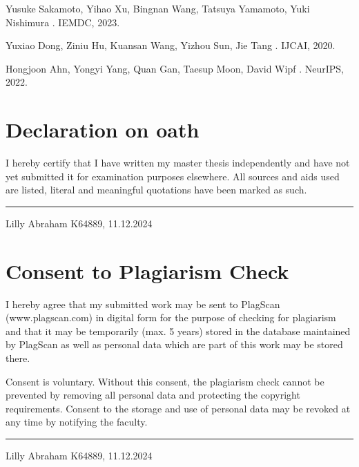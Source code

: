 \documentclass{report} %
\begin{document}
\begin{thebibliography}{00}
    \newblock Yusuke Sakamoto, Yihao Xu, Bingnan Wang, Tatsuya Yamamoto, Yuki Nishimura
    .
    \newblock IEMDC, 2023.

    \newblock Yuxiao Dong, Ziniu Hu, Kuansan Wang, Yizhou Sun, Jie Tang
    .
    \newblock IJCAI, 2020.

    \newblock Hongjoon Ahn, Yongyi Yang, Quan Gan, Taesup Moon, David Wipf
    .
    \newblock NeurIPS, 2022.

\end{thebibliography}


\chapter*{Declaration on oath}

\vspace{1cm}

\noindent I hereby certify that I have written my master thesis independently and have not yet submitted it for examination purposes elsewhere. 
All sources and aids used are listed, literal and meaningful quotations have been marked as such.

\vspace{3cm}
\hfill\rule{15cm}{0.4pt} 

\begin{center}
    Lilly Abraham K64889, 11.12.2024 
\end{center}

\newpage 

\chapter*{Consent to Plagiarism Check}
\vspace{1cm}

\noindent I hereby agree that my submitted work may be sent to PlagScan (www.plagscan.com) in digital form for the purpose of checking for plagiarism and that it 
may be temporarily (max. 5 years) stored in the database maintained by PlagScan as well as personal data which are part of this work may be stored there.

\vspace{0.5cm}

\noindent Consent is voluntary. Without this consent, the plagiarism check cannot be prevented by removing all personal data and protecting the copyright requirements. 
Consent to the storage and use of personal data may be revoked at any time by notifying the faculty.

\vspace{3cm}
\hfill\rule{15cm}{0.4pt} 

\begin{center}
    Lilly Abraham K64889, 11.12.2024 
\end{center}
\end{document}
